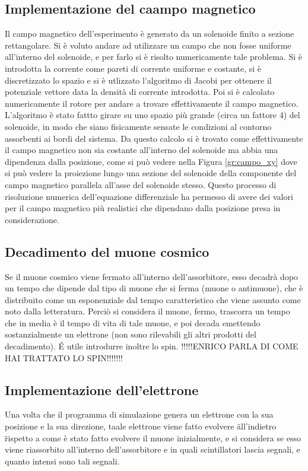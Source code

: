 \subsection{Implementazione del caampo magnetico}
Il campo magnetico dell'esperimento è generato da un solenoide finito a sezione rettangolare. Si è voluto andare ad utilizzare un campo che non fosse uniforme all'interno
del solenoide, e per farlo si è risolto numericamente tale problema. Si è introdotta la corrente come pareti di corrente uniforme e costante, si è discretizzato lo spazio
e si è utlizzato l'algoritmo di Jacobi per ottenere il potenziale vettore data la densità di corrente introdotta. Poi si è calcolato numericamente il rotore per
andare a trovare effettivamente il campo magnetico. L'algoritmo è stato fattto girare su uno spazio più grande (circa un fattore 4) del solenoide, in modo che siano
fisicamente sensate le condizioni al contorno assorbenti ai bordi del sistema. Da questo calcolo si è trovato come effettivamente il campo magnetico non sia costante
all'interno del solenoide ma abbia una dipendenza dalla posizione, come si può vedere nella Figura \ref{gr:campo_xy} dove si può vedere la proiezione lungo una
sezione del solenoide della componente del campo magnetico parallela all'asse del solenoide stesso. Questo processo di risoluzione numerica dell'equazione differenziale
ha permesso di avere dei valori per il campo magnetico più realistici che dipendano dalla posizione presa in considerazione.

\subsection{Decadimento del muone cosmico}
Se il muone cosmico viene fermato all'interno dell'assorbitore, esso decadrà dopo un tempo che dipende dal tipo di muone che si ferma (muone o antimuone), che è distribuito
come un esponenziale dal tempo caratteristico che viene assunto come noto dalla letteratura. Perciò si considera il muone, fermo, trascorra un tempo che in media è il tempo
di vita di tale muone, e poi decada emettendo sostanzialmente un elettrone (non sono rilevabili gli altri prodotti del decadimento). \'E utile introdurre inoltre lo spin.
!!!!!ENRICO PARLA DI COME HAI TRATTATO LO SPIN!!!!!!!

\subsection{Implementazione dell'elettrone}
Una volta che il programma di simulazione genera un elettrone con la sua posizione e la sua direzione, taale elettrone viene fatto evolvere \" all'indietro \" rispetto a
come è stato fatto evolvere il muone inizialmente, e si considera se esso viene riassorbito all'interno dell'assorbitore e in quali scintillatori lascia segnali, e quanto
intensi sono tali segnali.

